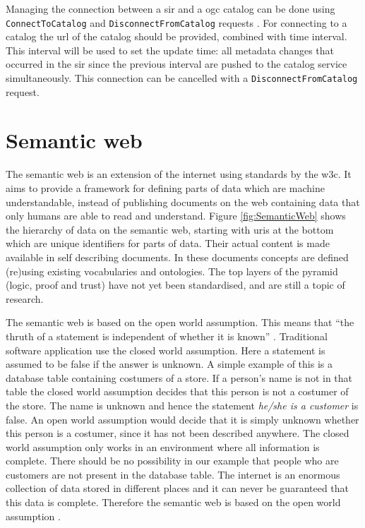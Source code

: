 Managing the connection between a \ac{sir} and a \ac{ogc} catalog can be done using \texttt{ConnectToCatalog} and \texttt{DisconnectFromCatalog} requests \citep{SW:OGC3}. For connecting to a catalog the \ac{url} of the catalog should be provided, combined with time interval. This interval will be used to set the update time: all metadata changes that occurred in the \ac{sir} since the previous interval are pushed to the catalog service simultaneously. This connection can be cancelled with a \texttt{DisconnectFromCatalog} request. 

\section{Semantic web}
\label{par:SemanticWeb}
The semantic web is an extension of the internet using standards by the \ac{w3c}. It aims to provide a framework for defining parts of data which are machine understandable, instead of publishing documents on the web containing data that only humans are able to read and understand. Figure \ref{fig:SemanticWeb} shows the hierarchy of data on the semantic web, starting with \acp{uri} at the bottom which are unique identifiers for parts of data. Their actual content is made available in self describing documents. In these documents concepts are defined (re)using existing vocabularies and ontologies. The top layers of the pyramid (logic, proof and trust) have not yet been standardised, and are still a topic of research.  

The semantic web is based on the open world assumption. This means that \enquote{the thruth of a statement is independent of whether it is known} \citep[p. 103]{LD:Hebeler}. Traditional software application use the closed world assumption. Here a statement is assumed to be false if the answer is unknown. A simple example of this is a database table containing costumers of a store. If a person's name is not in that table the closed world assumption decides that this person is not a costumer of the store. The name is unknown and hence the statement \textit{he/she is a customer} is false. An open world assumption would decide that it is simply unknown whether this person is a costumer, since it has not been described anywhere. The closed world assumption only works in an environment where all information is complete. There should be no possibility in our example that people who are customers are not present in the database table. The internet is an enormous collection of data stored in different places and it can never be guaranteed that this data is complete. Therefore the semantic web is based on the open world assumption \citep{LD:Hebeler}. 

